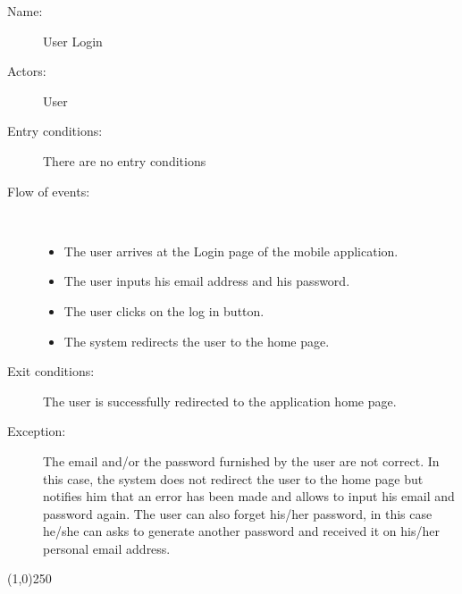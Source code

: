\begin{description}
	\item[Name:] User Login
	\item[Actors:] User
	\item[Entry conditions:] There are no entry conditions
	\item[Flow of events:]  \ \\
		\begin{itemize}
			\item The user arrives at the Login page of the mobile application.
			\item The user inputs his email address and his password.
			\item The user clicks on the log in button.
			\item The system redirects the user to the home page.
		\end{itemize}
	\item[Exit conditions:] The user is successfully redirected to the application home page.
	\item [Exception:] The email and/or the password furnished by the user are not correct. In this case, the system does not redirect the user to the home page but notifies him that an error has been made and allows to input his email and password again. The user can also forget his/her password, in this case he/she can asks to generate another password and received it on his/her personal email address.
\end{description}

\begin{center}
\line(1,0){250}
\end{center}

